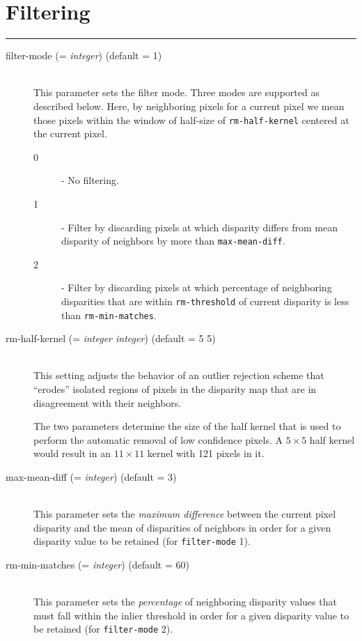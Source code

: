 \section{Filtering}
\label{filter_options}

\hrule
\bigskip

\begin{description}

\item[filter-mode \textnormal{\small{(= \emph{integer})}} (default = 1)]
\hfill \\ This parameter sets the filter mode. Three modes are supported
as described below. Here, by neighboring pixels for a current pixel we
mean those pixels within the window of half-size of
\texttt{rm-half-kernel} centered at the current pixel.
  \begin{description}
    \item[0] - No filtering.
    \item[1] - Filter by discarding pixels at which disparity differs from mean disparity of neighbors by more than \texttt{max-mean-diff}.
    \item[2] - Filter by discarding pixels at which percentage of neighboring disparities that are within \texttt{rm-threshold} of current disparity is less than \texttt{rm-min-matches}.
  \end{description}

\item[rm-half-kernel \textnormal{\small{(= \emph{integer integer})}} (default = 5 5)] \hfill \\
  This setting adjusts the behavior of an outlier rejection scheme
  that ``erodes'' isolated regions of pixels in the disparity map that
  are in disagreement with their neighbors.

  The two parameters determine the size of the half kernel that is
  used to perform the automatic removal of low confidence pixels.  A
  $5 \times 5$ half kernel would result in an $11 \times 11$ kernel
  with 121 pixels in it.

\item[max-mean-diff \textnormal{\small{(= \emph{integer})}} (default = 3)] \hfill \\
  This parameter sets the {\em maximum difference} between the current pixel disparity and the mean of disparities of neighbors in order for a
  given disparity value to be retained (for \texttt{filter-mode} 1).

\item[rm-min-matches \textnormal{\small{(= \emph{integer})}} (default = 60)] \hfill \\
  This parameter sets the {\em percentage} of neighboring disparity
  values that must fall within the inlier threshold in order for a
  given disparity value to be retained (for \texttt{filter-mode} 2).


\end{description}
